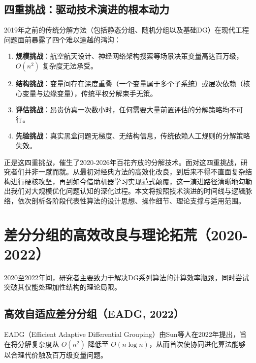 \subsection{四重挑战：驱动技术演进的根本动力}
2019年之前的传统分解方法（包括静态分组、随机分组以及基础DG）在现代工程问题面前暴露了四个难以逾越的鸿沟：
\begin{enumerate}
    \item \textbf{规模挑战}：航空航天设计、神经网络架构搜索等场景决策变量高达百万级，$O(n^2)$ 复杂度无法承受。
    \item \textbf{结构挑战}：变量间存在深度重叠（一个变量属于多个子系统）或层次依赖（核心变量与边缘变量），传统平权分解束手无策。
    \item \textbf{评估挑战}：昂贵仿真一次数小时，任何需要大量前置评估的分解策略均不可行。
    \item \textbf{先验挑战}：真实黑盒问题无梯度、无结构信息，传统依赖人工规则的分解策略失效。
\end{enumerate}
正是这四重挑战，催生了2020-2026年百花齐放的分解技术。面对这四重挑战，研究者们并非一蹴而就。从最初对经典方法的高效化改良，到后来不得不直面复杂结构进行硬核攻坚，再到如今借助机器学习实现范式颠覆，这一演进路径清晰地勾勒出我们对大规模优化问题认知的深化过程。本文将按照技术演进的时间线与逻辑脉络，依次剖析各阶段代表性算法的设计思想、操作细节、理论支撑与适用范围。

\section{差分分组的高效改良与理论拓荒（2020-2022）}

2020至2022年间，研究者主要致力于解决DG系列算法的计算效率瓶颈，同时尝试突破其仅能处理加性结构的理论局限。

\subsection{高效自适应差分分组（EADG, 2022）}
EADG（Efficient Adaptive Differential Grouping）由Sun等人在2022年提出，旨在将分解复杂度从 $O(n^2)$ 降低至 $O(n \log n)$，从而首次使协同进化算法能够以合理代价触及百万级变量问题。

